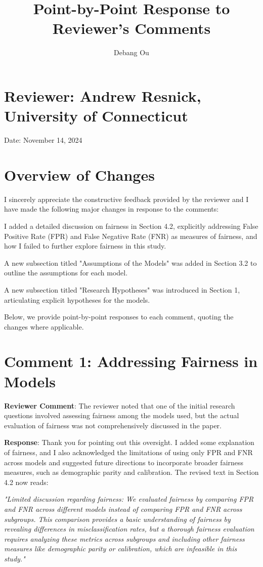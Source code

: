 \documentclass[12pt]{article}
\title{Point-by-Point Response to Reviewer's Comments}
\date{}
\begin{document}
\maketitle
\author{\begin{center} Debang Ou \end{center}}

\section*{Reviewer: Andrew Resnick, University of Connecticut}
Date: November 14, 2024

\section*{Overview of Changes}
I sincerely appreciate the constructive feedback provided by the reviewer and I have made the following major changes in response to the comments:

I added a detailed discussion on fairness in Section 4.2, explicitly addressing False Positive Rate (FPR) and False Negative Rate (FNR) as measures of fairness, and how I failed to further explore fairness in this study.

A new subsection titled "Assumptions of the Models" was added in Section 3.2 to outline the assumptions for each model.

A new subsection titled "Research Hypotheses" was introduced in Section 1, articulating explicit hypotheses for the models.

Below, we provide point-by-point responses to each comment, quoting the changes where applicable.

\section*{Comment 1: Addressing Fairness in Models}
\textbf{Reviewer Comment}: The reviewer noted that one of the initial research questions involved assessing fairness among the models used, but the actual evaluation of fairness was not comprehensively discussed in the paper.

\textbf{Response}: Thank you for pointing out this oversight. I added some explanation of fairness, and I also acknowledged the limitations of using only FPR and FNR across models and suggested future directions to incorporate broader fairness measures, such as demographic parity and calibration. The revised text in Section 4.2 now reads:

\textit{"Limited discussion regarding fairness: We evaluated fairness by comparing FPR and FNR across different models instead of comparing FPR and FNR across subgroups. This comparison provides a basic understanding of fairness by revealing differences in misclassification rates, but a thorough fairness evaluation requires analyzing these metrics across subgroups and including other fairness measures like demographic parity or calibration, which are infeasible in this study."}
\end{document}
